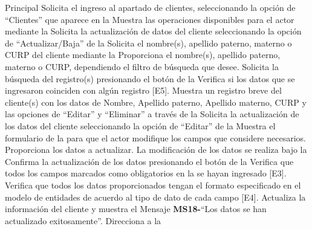 	\begin{UCtrayectoria}{Principal}
		\UCpaso[\UCactor] Solicita el ingreso al apartado de clientes, seleccionando la opción de ``Clientes'' que aparece en la 
		\UCpaso Muestra las operaciones disponibles para el actor mediante la 
		\UCpaso[\UCactor] Solicita la actualización de datos del cliente seleccionando la opción de ``Actualizar/Baja'' de la 
		\UCpaso Solicita el nombre(s), apellido paterno, materno o CURP del cliente mediante la 
		\UCpaso[\UCactor] Proporciona el nombre(s), apellido paterno, materno o CURP, dependiendo el filtro de búsqueda que desee.
		\UCpaso[\UCactor] Solicita la búsqueda del registro(s) presionando el botón  de la 
		\UCpaso Verifica si los datos que se ingresaron coinciden con algún registro [E5].
		\UCpaso Muestra un registro breve del cliente(s) con los datos de Nombre, Apellido paterno, Apellido materno, CURP y las opciones de ``Editar'' y ``Eliminar'' a través de la 
		\UCpaso[\UCactor] Solicita la actualización de los datos del cliente seleccionando la opción de ``Editar'' de la 
		\UCpaso Muestra el formulario de la  para que el actor modifique los campos que considere necesarios. 
		\UCpaso[\UCactor] Proporciona los datos a actualizar. La modificación de los datos se realiza bajo la  
		\UCpaso[\UCactor] Confirma la actualización de los datos presionando el botón  de la 
		\UCpaso Verifica que todos los campos marcados como obligatorios en la  se hayan ingresado [E3].
		\UCpaso Verifica que todos los datos proporcionados tengan el formato especificado en el modelo de entidades de acuerdo al tipo de dato de cada campo [E4].
		\UCpaso Actualiza la información del cliente y muestra el Mensaje {\bf MS18-}``Los datos se han actualizado exitosamente''.
		\UCpaso Direcciona a la 
	\end{UCtrayectoria}
	
